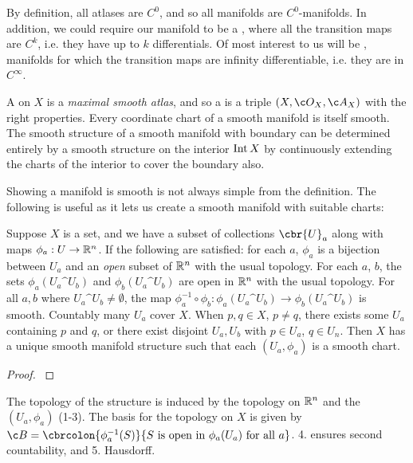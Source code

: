 By definition, all atlases are \(C^0\), and so all manifolds are \(C^0\)-manifolds.
In addition, we could require our manifold to be a , where all the transition maps are \(C^k\), i.e. they have up to \(k\) differentials.
Of most interest to us will be , manifolds for which the transition maps are infinity differentiable, i.e. they are in \(C^\infty\).

A  on \(X\) is a \emph{maximal smooth atlas}, and so a  is a triple \((X, \topo{X}, \atlas{X})\) with the right properties.
Every coordinate chart of a smooth manifold is itself smooth.
The smooth structure of a smooth manifold with boundary can be determined entirely by a smooth structure on the interior \(\operatorname{Int} X\) by continuously extending the charts of the interior to cover the boundary also.

Showing a manifold is smooth is not always simple from the definition.
The following is useful as it lets us create a smooth manifold with suitable charts: \begin{lemma} \label{lem:smooth_chart} Suppose \(X\) is a set, and we have a subset of collections \(\cbr{U}_a\) along with maps \(\phi_a: U\to \mathbb{R}^n\).
	If the following are satisfied: \1 for each \(a\), \(\phi_a\) is a bijection between \(U_a\) and an \emph{open} subset of \(\mathbb{R}^n\) with the usual topology.
	\2 For each \(a\), \(b\), the sets \(\phi_a(U_a\^U_b)\) and \(\phi_b(U_a\^U_b)\) are open in \(\mathbb{R}^n\) with the usual topology.
	\3 For all \(a,b\) where \(U_a\^U_b \neq \emptyset\), the map \(\phi^{-1}_a\circ\phi_b: \phi_a(U_a\^U_b) \to \phi_b(U_a\^U_b)\) is smooth.
	\4 Countably many \(U_a\) cover \(X\).
	\5 When \(p, q\in X\), \(p\neq q\), there exists some \(U_a\) containing \(p\) and \(q\), or there exist disjoint \(U_a, U_b\) with \(p\in U_a\), \(q\in U_n\).
	\0
	Then \(X\) has a unique smooth manifold structure such that each \((U_a, \phi_a)\) is a smooth chart.
\end{lemma}
\begin{proof}
	\cite[p.22]{lee2013smooth}
\end{proof}
The topology of the structure is induced by the topology on \(\mathbb{R}^n\) and the \((U_a, \phi_a)\) (1-3).
The basis for the topology on \(X\) is given by \(\basis = \cbrcolon{\phi_a^{-1}(S)}{S \text{ is open in } \phi_a(U_a) \text{ for all } a}\).
4. ensures second countability, and 5.
Hausdorff.

